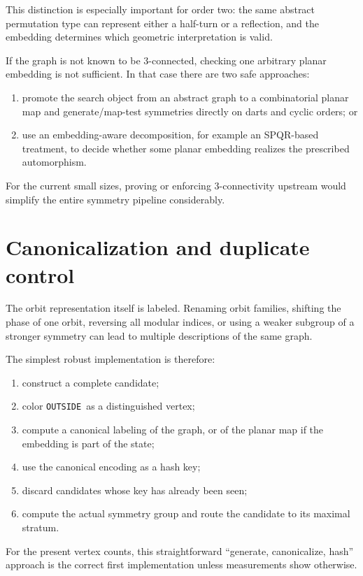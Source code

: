 \documentclass[11pt]{article}
\newcommand{\OUT}{\texttt{OUTSIDE}}
\begin{document}
This distinction is especially important for order two: the same abstract permutation type can represent either a half-turn or a reflection, and the embedding determines which geometric interpretation is valid.

If the graph is not known to be 3-connected, checking one arbitrary planar embedding is not sufficient. In that case there are two safe approaches:
\begin{enumerate}
  \item promote the search object from an abstract graph to a combinatorial planar map and generate/map-test symmetries directly on darts and cyclic orders; or
  \item use an embedding-aware decomposition, for example an SPQR-based treatment, to decide whether some planar embedding realizes the prescribed automorphism.
\end{enumerate}

For the current small sizes, proving or enforcing 3-connectivity upstream would simplify the entire symmetry pipeline considerably.

\section{Canonicalization and duplicate control}

The orbit representation itself is labeled. Renaming orbit families, shifting the phase of one orbit, reversing all modular indices, or using a weaker subgroup of a stronger symmetry can lead to multiple descriptions of the same graph.

The simplest robust implementation is therefore:
\begin{enumerate}
  \item construct a complete candidate;
  \item color \OUT\ as a distinguished vertex;
  \item compute a canonical labeling of the graph, or of the planar map if the embedding is part of the state;
  \item use the canonical encoding as a hash key;
  \item discard candidates whose key has already been seen;
  \item compute the actual symmetry group and route the candidate to its maximal stratum.
\end{enumerate}

For the present vertex counts, this straightforward ``generate, canonicalize, hash'' approach is the correct first implementation unless measurements show otherwise.
\end{document}
